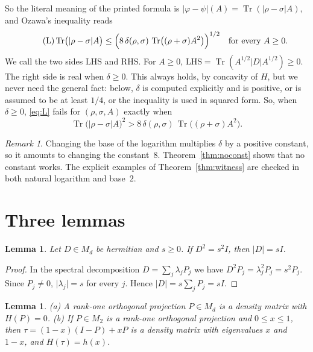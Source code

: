\documentclass[11pt]{amsart}
\newtheorem{lemma}[theorem]{Lemma}
\theoremstyle{definition}\newtheorem{definition}[theorem]{Definition}
\theoremstyle{remark}\newtheorem{remark}[theorem]{Remark}
\DeclareMathOperator{\Tr}{Tr}
\newcommand{\abs}[1]{\lvert #1\rvert}
\newcommand{\LHS}{\mathrm{LHS}}
\newcommand{\RHS}{\mathrm{RHS}}
\begin{document}
So the literal meaning of the printed formula is \(\abs{\varphi-\psi}(A)=\Tr(\abs{\rho-\sigma}A)\), and Ozawa's inequality reads
\begin{equation}\label{eq:L}\tag{L}
\Tr\bigl(\abs{\rho-\sigma}A\bigr)\le\Bigl(8\,\delta(\rho,\sigma)\,\Tr\bigl((\rho+\sigma)A^2\bigr)\Bigr)^{1/2}\quad\text{for every }A\ge0 .
\end{equation}
We call the two sides \(\LHS\) and \(\RHS\). For \(A\ge0\), \(\LHS=\Tr(A^{1/2}\abs{D}A^{1/2})\ge0\). The right side is real when \(\delta\ge0\). This always holds, by concavity of \(H\), but we never need the general fact: below, \(\delta\) is computed explicitly and is positive, or is assumed to be at least \(1/4\), or the inequality is used in squared form. So, when \(\delta\ge0\), \eqref{eq:L} fails for \((\rho,\sigma,A)\) exactly when
\begin{equation}\label{eq:Lsq}
\Tr\bigl(\abs{\rho-\sigma}A\bigr)^2>8\,\delta(\rho,\sigma)\,\Tr\bigl((\rho+\sigma)A^2\bigr).
\end{equation}

\begin{remark}\label{rem:base}
Changing the base of the logarithm multiplies \(\delta\) by a positive constant, so it amounts to changing the constant~\(8\). Theorem~\ref{thm:noconst} shows that no constant works. The explicit examples of Theorem~\ref{thm:witness} are checked in both natural logarithm and base~\(2\).
\end{remark}

\section{Three lemmas}\label{sec:lemmas}

\begin{lemma}\label{lem:abs}
Let \(D\in M_d\) be hermitian and \(s\ge0\). If \(D^2=s^2I\), then \(\abs{D}=sI\).
\end{lemma}

\begin{proof}
In the spectral decomposition \(D=\sum_j\lambda_jP_j\) we have \(D^2P_j=\lambda_j^2P_j=s^2P_j\). Since \(P_j\ne0\), \(\abs{\lambda_j}=s\) for every \(j\). Hence \(\abs{D}=s\sum_jP_j=sI\).
\end{proof}

\begin{lemma}\label{lem:entropy}
\textup{(a)} A rank-one orthogonal projection \(P\in M_d\) is a density matrix with \(H(P)=0\). \textup{(b)} If \(P\in M_2\) is a rank-one orthogonal projection and \(0\le x\le1\), then \(\tau=(1-x)(I-P)+xP\) is a density matrix with eigenvalues \(x\) and \(1-x\), and \(H(\tau)=h(x)\).
\end{lemma}
\end{document}

